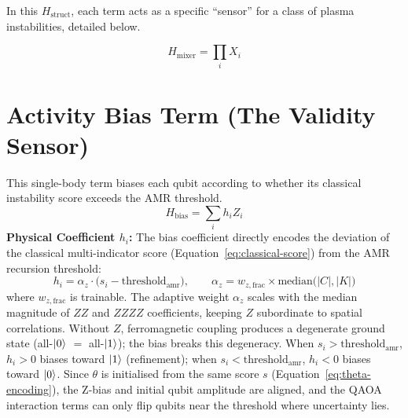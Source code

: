 \documentclass[12pt, a4paper, oneside]{report}
\begin{document}
\noindent In this $H_{\text{struct}}$, each term acts as a specific ``sensor'' for a class of plasma instabilities, detailed below.

\begin{equation}
    H_{\text{mixer}} = \prod_i X_i
\end{equation}



\section{Activity Bias Term (The Validity Sensor)}
This single-body term biases each qubit according to whether its classical instability score exceeds the AMR threshold.
\begin{equation}
    H_{\text{bias}} = \sum_{i} h_i Z_i
\end{equation}
\textbf{Physical Coefficient $h_i$:} The bias coefficient directly encodes the deviation of the classical multi-indicator score (Equation~\ref{eq:classical-score}) from the AMR recursion threshold:
\begin{equation}
    h_i = \alpha_z \cdot \bigl(s_i - \text{threshold}_{\text{amr}}\bigr), \qquad \alpha_z = w_{z,\text{frac}} \times \text{median}\bigl(|C|, |K|\bigr)
\end{equation}
where $w_{z,\text{frac}}$ is trainable. The adaptive weight $\alpha_z$ scales with the median magnitude of $ZZ$ and $ZZZZ$ coefficients, keeping $Z$ subordinate to spatial correlations. Without $Z$, ferromagnetic coupling produces a degenerate ground state (all-$\ket{0}$ $=$ all-$\ket{1}$); the bias breaks this degeneracy. When $s_i > \text{threshold}_{\text{amr}}$, $h_i > 0$ biases toward $\ket{1}$ (refinement); when $s_i < \text{threshold}_{\text{amr}}$, $h_i < 0$ biases toward $\ket{0}$. Since $\theta$ is initialised from the same score $s$ (Equation~\ref{eq:theta-encoding}), the Z-bias and initial qubit amplitude are aligned, and the QAOA interaction terms can only flip qubits near the threshold where uncertainty lies.
\end{document}
